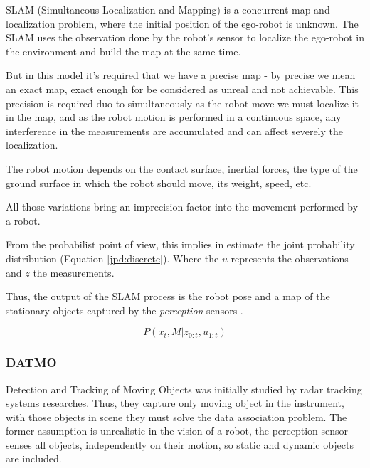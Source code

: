 SLAM (Simultaneous Localization and Mapping) is a concurrent map and localization problem, where the initial position of the ego-robot is unknown. The SLAM uses the observation done by the robot's sensor to localize the ego-robot in the environment and build the map at the same time\cite{VU-2009-454238}. 

But in this model it's required that we have a precise map - by precise we mean an exact map, exact enough for be considered as unreal and not achievable. This precision is required duo to simultaneously as the robot move we must localize it in the map, and as the robot motion is performed in a continuous space, any interference in the measurements are accumulated and can affect severely the localization.

The robot motion depends on the contact surface, inertial forces, the type of the ground surface in which the robot should move, its weight, speed, etc.

All those variations bring an imprecision factor into the movement performed by a robot.

From the probabilist point of view, this implies in estimate the joint probability distribution (Equation \ref{jpd:discrete}). Where the $u$ represents the observations and $z$ the measurements.

Thus, the output of the SLAM process is the robot pose and a map of the stationary objects captured by the \textit{perception} sensors \cite{iyengar1991autonomous}.


\begin{equation}
\label{jpd:discrete}
P(x_t,M | z_{0:t}, u_{1:t})
\end{equation}


\subsubsection{DATMO}

Detection and Tracking of Moving Objects was initially studied by radar tracking systems \cite{VU-2009-454238} researches. Thus, they capture only moving object in the instrument, with those objects in scene they must solve the data association problem. The former assumption is unrealistic in the vision of a robot, the perception sensor senses all objects, independently on their motion, so static and dynamic objects are included.

